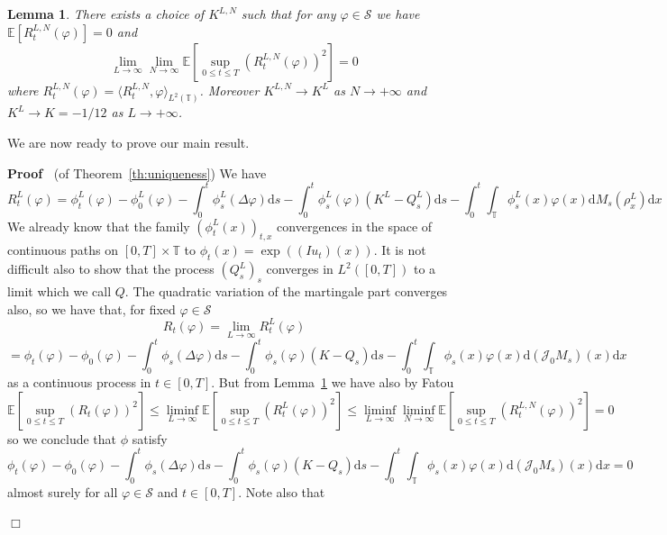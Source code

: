 \documentclass[a4paper,11pt]{article}
\newcommand{\mathd}{\mathrm{d}}
\newenvironment{proof}{\noindent\textbf{Proof\ }}{\hspace*{\fill}$\Box$\medskip}
\newtheorem{lemma}{Lemma}
\newcommand{\cS}{\mathscr{S}}
\newcommand{\JJ}{\mathcal{J}}
\begin{document}
\begin{lemma}
  \label{lemma:key}There exists a choice of $K^{L, N}$ such that for any
  $\varphi \in \cS$ we have $\mathbb{E} [R^{L, N}_t (\varphi)] = 0$ and
  \[ \lim_{L \rightarrow \infty} \lim_{N \rightarrow \infty} \mathbb{E}
     [\sup_{0 \leqslant t \leqslant T} (R^{L, N}_t (\varphi))^2] = 0 \]
  where $R^{L, N}_t (\varphi) = \langle R^{L, N}_t, \varphi \rangle_{L^2
  (\mathbb{T})}$. Moreover $K^{L, N} \rightarrow K^L$ as $N \rightarrow +
  \infty$ and $K^L \rightarrow K = - 1 / 12$ as $L \rightarrow + \infty$.
\end{lemma}

We are now ready to prove our main result.

\begin{proof}
  (of Theorem~\ref{th:uniqueness}) We have
  \[ R^L_t (\varphi) = \phi_t^L (\varphi) - \phi_0^L (\varphi) - \int_0^t
     \phi_s^L (\Delta \varphi) \mathd s - \int_0^t \phi_s^L (\varphi) (K^L -
     Q_s^L) \mathd s - \int_0^t \int_{\mathbb{T}} \phi_s^L (x) \varphi (x)
     \mathd M_s (\rho_x^L) \mathd x \]
  We already know that the family $(\phi_t^L (x))_{t, x}$ convergences in the
  space of continuous paths on $[0, T] \times \mathbb{T}$ to $\phi_t (x) =
  \exp ((I u_t) (x))$. It is not difficult also to show that the process
  $(Q_s^L)_s$ converges in $L^2 ([0, T])$ to a limit which we call $Q$. The
  quadratic variation of the martingale part converges also, so we have that,
  for fixed $\varphi \in \cS$
  \[ R_t (\varphi) = \lim_{L \rightarrow \infty} R^L_t (\varphi) \]
  \[ = \phi_t (\varphi) - \phi_0 (\varphi) - \int_0^t \phi_s (\Delta \varphi)
     \mathd s - \int_0^t \phi_s (\varphi) (K - Q_s) \mathd s - \int_0^t
     \int_{\mathbb{T}} \phi_s (x) \varphi (x) \mathd \left( \JJ_0 M_s \right)
     (x) \mathd x \]
  as a continuous process in $t \in [0, T]$. But from Lemma~\ref{lemma:key} we
  have also by Fatou
  \[ \mathbb{E} [\sup_{0 \leqslant t \leqslant T} (R^{}_t (\varphi))^2]
     \leqslant \liminf_{L \rightarrow \infty} \mathbb{E} [\sup_{0 \leqslant t
     \leqslant T} (R^L_t (\varphi))^2] \leqslant \liminf_{L \rightarrow
     \infty} \liminf_{N \rightarrow \infty} \mathbb{E} [\sup_{0 \leqslant t
     \leqslant T} (R^{L, N}_t (\varphi))^2] = 0 \]
  so we conclude that $\phi$ satisfy
  \[ \phi_t (\varphi) - \phi_0 (\varphi) - \int_0^t \phi_s (\Delta \varphi)
     \mathd s - \int_0^t \phi_s (\varphi) (K - Q_s) \mathd s - \int_0^t
     \int_{\mathbb{T}} \phi_s (x) \varphi (x) \mathd \left( \JJ_0 M_s \right)
     (x) \mathd x = 0 \]
  almost surely for all $\varphi \in \cS$ and $t \in [0, T]$. Note also that

\end{proof}
\end{document}
